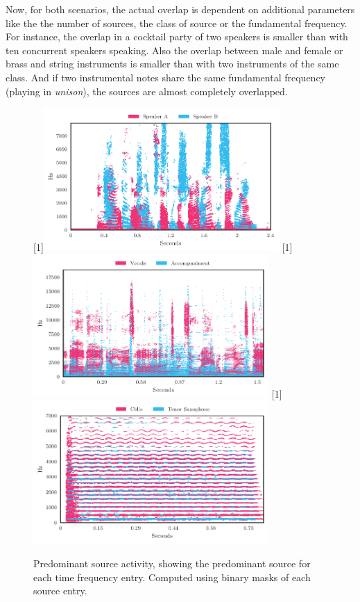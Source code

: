 Now, for both scenarios, the actual overlap is dependent on additional parameters like the the number of sources, the class of source or the fundamental frequency.
For instance, the overlap in a cocktail party of two speakers is smaller than with ten concurrent speakers speaking.
Also the overlap between male and female or brass and string instruments is smaller than with two instruments of the same class. 
And if two instrumental notes share the same fundamental frequency (playing in \emph{unison}), the sources are almost completely overlapped.
\par
\begin{figure}[h]
\centering
{}%
[1\textwidth]{\includegraphics[width=0.8\textwidth]{gfx/dominance_map_speakers.pdf}}%
\hspace{0.2\textwidth} %
[1\textwidth]{\includegraphics[width=0.8\textwidth]{gfx/dominance_map_vocacc.pdf}}%
\hspace{0.2\textwidth} %
[1\textwidth]{\includegraphics[width=0.8\textwidth]{gfx/dominance_map_unison.pdf}}%
\caption{Predominant source activity, showing the predominant source for each time frequency entry. Computed using binary masks of each source entry.}
\label{fig:dominance}
\end{figure}


